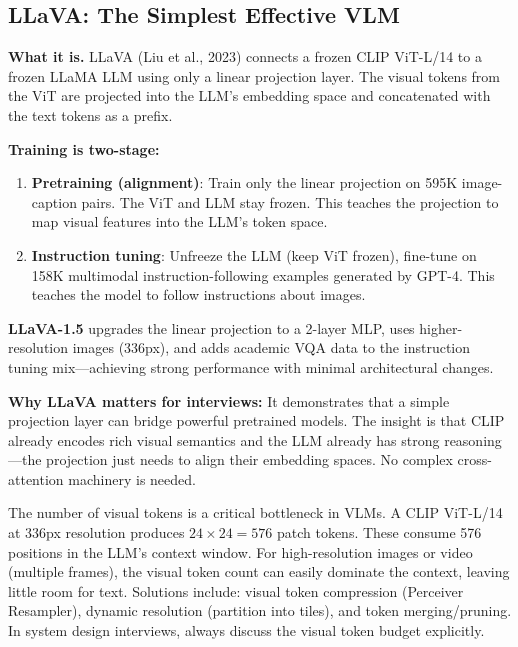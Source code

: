 \subsection{LLaVA: The Simplest Effective VLM}

\textbf{What it is.} LLaVA (Liu et al., 2023) connects a frozen CLIP ViT-L/14 to a frozen LLaMA LLM using only a linear projection layer. The visual tokens from the ViT are projected into the LLM's embedding space and concatenated with the text tokens as a prefix.

\textbf{Training is two-stage:}
\begin{enumerate}
    \item \textbf{Pretraining (alignment)}: Train only the linear projection on 595K image-caption pairs. The ViT and LLM stay frozen. This teaches the projection to map visual features into the LLM's token space.
    \item \textbf{Instruction tuning}: Unfreeze the LLM (keep ViT frozen), fine-tune on 158K multimodal instruction-following examples generated by GPT-4. This teaches the model to follow instructions about images.
\end{enumerate}

\textbf{LLaVA-1.5} upgrades the linear projection to a 2-layer MLP, uses higher-resolution images (336px), and adds academic VQA data to the instruction tuning mix---achieving strong performance with minimal architectural changes.

\textbf{Why LLaVA matters for interviews:} It demonstrates that a simple projection layer can bridge powerful pretrained models. The insight is that CLIP already encodes rich visual semantics and the LLM already has strong reasoning---the projection just needs to align their embedding spaces. No complex cross-attention machinery is needed.

\begin{warningbox}
The number of visual tokens is a critical bottleneck in VLMs. A CLIP ViT-L/14 at 336px resolution produces $24 \times 24 = 576$ patch tokens. These consume 576 positions in the LLM's context window. For high-resolution images or video (multiple frames), the visual token count can easily dominate the context, leaving little room for text. Solutions include: visual token compression (Perceiver Resampler), dynamic resolution (partition into tiles), and token merging/pruning. In system design interviews, always discuss the visual token budget explicitly.
\end{warningbox}

